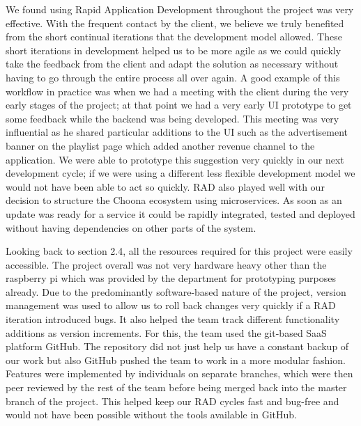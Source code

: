 We found using Rapid Application Development throughout the project was very effective. With the frequent contact by the client, we believe we truly benefited from the short continual iterations that the development model allowed. These short iterations in development helped us to be more agile as we could quickly take the feedback from the client and adapt the solution as necessary without having to go through the entire process all over again. A good example of this workflow in practice was when we had a meeting with the client during the very early stages of the project; at that point we had a very early UI prototype to get some feedback while the backend was being developed. This meeting was very influential as he shared particular additions to the UI such as the advertisement banner on the playlist page which added another revenue channel to the application. We were able to prototype this suggestion very quickly in our next development cycle; if we were using a different less flexible development model we would not have been able to act so quickly. RAD also played well with our decision to structure the Choona ecosystem using microservices. As soon as an update was ready for a service it could be rapidly integrated, tested and deployed without having dependencies on other parts of the system.

Looking back to section 2.4, all the resources required for this project were easily accessible. The project overall was not very hardware heavy other than the raspberry pi which was provided by the department for prototyping purposes already. Due to the predominantly software-based nature of the project, version management was used to allow us to roll back changes very quickly if a RAD iteration introduced bugs. It also helped the team track different functionality additions as version increments. For this, the team used the git-based SaaS platform GitHub. The repository did not just help us have a constant backup of our work but also GitHub pushed the team to work in a more modular fashion. Features were implemented by individuals on separate branches, which were then peer reviewed by the rest of the team before being merged back into the master branch of the project. This helped keep our RAD cycles fast and bug-free and would not have been possible without the tools available in GitHub.

